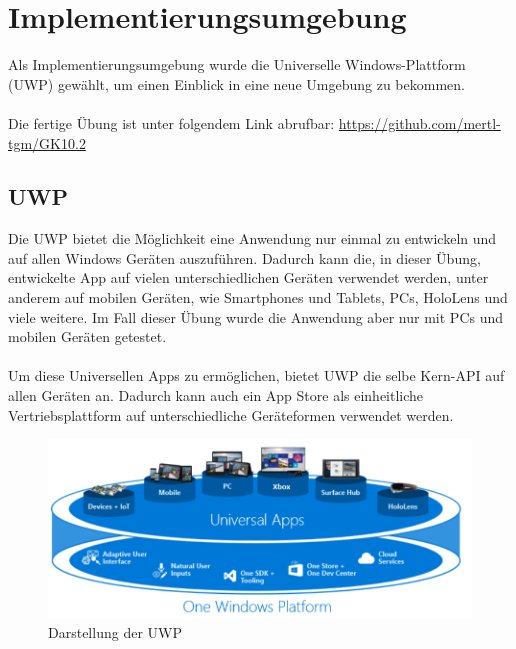 
\section{Implementierungsumgebung}

Als Implementierungsumgebung wurde die Universelle Windows-Plattform (UWP) gewählt, um einen Einblick in eine neue Umgebung zu bekommen.
\\\\
Die fertige Übung ist unter folgendem Link abrufbar: \url{https://github.com/mertl-tgm/GK10.2}

\subsection{UWP}

Die UWP bietet die Möglichkeit eine Anwendung nur einmal zu entwickeln und auf allen Windows Geräten auszuführen. Dadurch kann die, in dieser Übung, entwickelte App auf vielen unterschiedlichen Geräten verwendet werden, unter anderem auf mobilen Geräten, wie Smartphones und Tablets, PCs, HoloLens und viele weitere. Im Fall dieser Übung wurde die Anwendung aber nur mit PCs und mobilen Geräten getestet.
\\\\
Um diese Universellen Apps zu ermöglichen, bietet UWP die selbe Kern-API auf allen Geräten an. Dadurch kann auch ein App Store als einheitliche Vertriebsplattform auf unterschiedliche Geräteformen verwendet werden.

\begin{figure}[H]
	\centering
	\includegraphics[width=0.7\linewidth]{images/screenshot001}
	\caption{Darstellung der UWP}
	\label{fig:screenshot001}
\end{figure}

